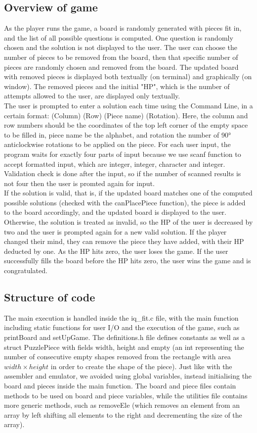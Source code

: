 \documentclass{article}
\begin{document}
\subsection{Overview of game}
As the player runs the game, a board is randomly generated with pieces fit in, and the list of all possible questions is computed. One question is randomly chosen and the solution is not displayed to the user. The user can choose the number of pieces to be removed from the board, then that specific number of pieces are randomly chosen and removed from the board. The updated board with removed pieces is displayed both textually (on terminal) and graphically (on window). The removed pieces and the initial "HP", which is the number of attempts allowed to the user, are displayed only textually. \\
The user is prompted to enter a solution each time using the Command Line, in a certain format: (Column) (Row) (Piece name) (Rotation). Here, the column and row numbers should be the coordinates of the top left corner of the empty space to be filled in, piece name be the alphabet, and rotation the number of 90° anticlockwise rotations to be applied on the piece. For each user input, the program waits for exactly four parts of input because we use scanf function to accept formatted input, which are integer, integer, character and integer. Validation check is done after the input, so if the number of scanned results is not four then the user is promted again for input. \\
If the solution is valid, that is, if the updated board matches one of the computed possible solutions (checked with the canPlacePiece function), the piece is added to the board accordingly, and the updated board is displayed to the user. Otherwise, the solution is treated as invalid, so the HP of the user is decreased by two and the user is prompted again for a new valid solution. If the player changed their mind, they can remove the piece they have added, with their HP deducted by one. As the HP hits zero, the user loses the game. If the user successfully fills the board before the HP hits zero, the user wins the game and is congratulated. 

\subsection{Structure of code}

The main execution is handled inside the iq\_fit.c file, with the main function including static functions for user I/O and the execution of the game, such as printBoard and setUpGame. The definitions.h file defines constants as well as a struct PuzzlePiece with fields width, height and empty (an int representing the number of consecutive empty shapes removed from the rectangle with area $width \times height$ in order to create the shape of the piece). Just like with the assembler and emulator, we avoided using global variables, instead initialising the board and pieces inside the main function. The board and piece files contain methods to be used on board and piece variables, while the utilities file contains more generic methods, such as removeEle (which removes an element from an array by left shifting all elements to the right and decrementing the size of the array).
\end{document}

